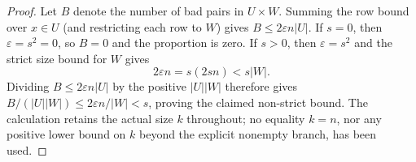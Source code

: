 \begin{proof}
Let $B$ denote the number of bad pairs in $U\times W$. Summing the row
bound over $x\in U$ (and restricting each row to $W$) gives
$B\leq2\varepsilon n|U|$. If $s=0$, then $\varepsilon=s^2=0$,
so $B=0$ and the proportion is zero. If $s>0$, then
$\varepsilon=s^2$ and the strict size bound for $W$ gives
\[
 2\varepsilon n= s(2sn)<s|W|.
\]
Dividing $B\leq2\varepsilon n|U|$ by the positive $|U||W|$
therefore gives
$B/(|U||W|)\leq2\varepsilon n/|W|<s$, proving the claimed
non-strict bound. The calculation retains the actual size $k$ throughout;
no equality $k=n$, nor any positive lower bound on $k$ beyond the
explicit nonempty branch, has been used.
\end{proof}
